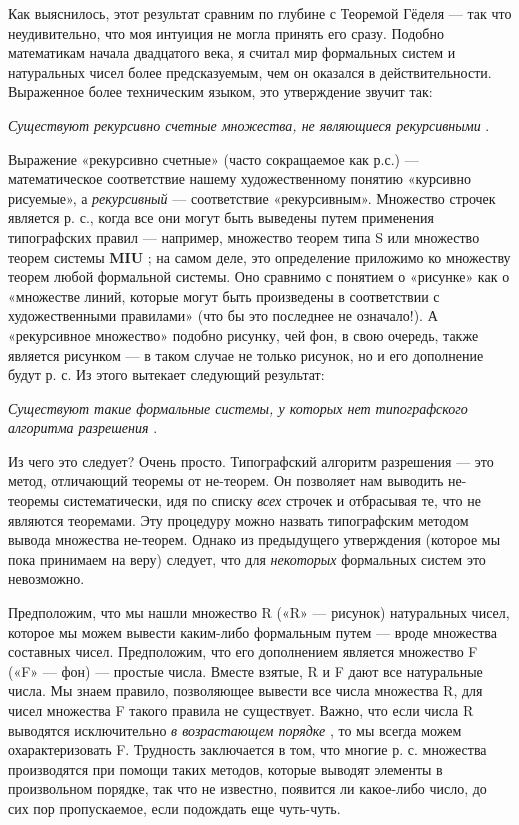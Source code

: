 Как выяснилось, этот результат сравним по глубине с Теоремой Гёделя --- так что неудивительно, что моя интуиция не могла принять его сразу. Подобно математикам начала двадцатого века, я считал мир формальных систем и натуральных чисел более предсказуемым, чем он оказался в действительности. Выраженное более техническим языком, это утверждение звучит так:

\emph{Существуют рекурсивно счетные множества, не являющиеся рекурсивными} .

Выражение «рекурсивно счетные» (часто сокращаемое как р.с.) --- математическое соответствие нашему художественному понятию «курсивно рисуемые», а \emph{рекурсивный} --- соответствие «рекурсивным». Множество строчек является р. с., когда все они могут быть выведены путем применения типографских правил --- например, множество теорем типа S или множество теорем системы \textbf{MIU} ; на самом деле, это определение приложимо ко множеству теорем любой формальной системы. Оно сравнимо с понятием о «рисунке» как о «множестве линий, которые могут быть произведены в соответствии с художественными правилами» (что бы это последнее не означало!). А «рекурсивное множество» подобно рисунку, чей фон, в свою очередь, также является рисунком --- в таком случае не только рисунок, но и его дополнение будут р. с. Из этого вытекает следующий результат:

\emph{Существуют такие формальные системы, у которых нет типографского алгоритма разрешения} .

Из чего это следует? Очень просто. Типографский алгоритм разрешения --- это метод, отличающий теоремы от не-теорем. Он позволяет нам выводить не-теоремы систематически, идя по списку \emph{всех} строчек и отбрасывая те, что не являются теоремами. Эту процедуру можно назвать типографским методом вывода множества не-теорем. Однако из предыдущего утверждения (которое мы пока принимаем на веру) следует, что для \emph{некоторых} формальных систем это невозможно.

Предположим, что мы нашли множество R («R» --- рисунок) натуральных чисел, которое мы можем вывести каким-либо формальным путем --- вроде множества составных чисел. Предположим, что его дополнением является множество F («F» --- фон) --- простые числа. Вместе взятые, R и F дают все натуральные числа. Мы знаем правило, позволяющее вывести все числа множества R, для чисел множества F такого правила не существует. Важно, что если числа R выводятся исключительно \emph{в возрастающем порядке} , то мы всегда можем охарактеризовать F. Трудность заключается в том, что многие р. с. множества производятся при помощи таких методов, которые выводят элементы в произвольном порядке, так что не известно, появится ли какое-либо число, до сих пор пропускаемое, если подождать еще чуть-чуть.

